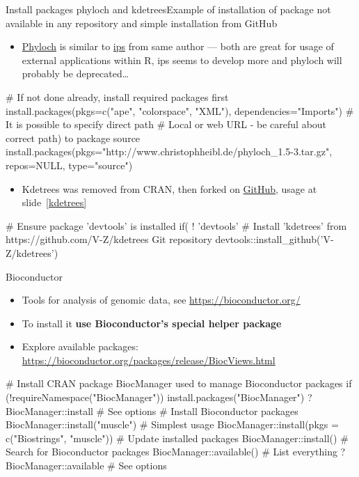 \documentclass[compress, xelatex, 11pt, xcolor=svgnames, aspectratio=169, url={hyphens, lowtilde}]{beamer}
\begin{document}
\begin{frame}[fragile]{Install packages phyloch and kdetrees}{Example of installation of package not available in any repository and simple installation from GitHub}
	\label{phyloch}
	\begin{itemize}
		\item \href{http://www.christophheibl.de/Rpackages.html}{Phyloch} is similar to \href{https://CRAN.R-project.org/package=ips}{ips} from same author --- both are great for usage of external applications within R, ips seems to develop more and phyloch will probably be deprecated\ldots
	\end{itemize}
	\begin{spluscode}
    # If not done already, install required packages first
    install.packages(pkgs=c("ape", "colorspace", "XML"),
      dependencies="Imports")
    # It is possible to specify direct path
    # Local or web URL - be careful about correct path) to package source
    install.packages(pkgs="http://www.christophheibl.de/phyloch_1.5-3.tar.gz",
      repos=NULL, type="source")
	\end{spluscode}
	\label{kdetreesinst}
	\begin{itemize}
		\item Kdetrees was removed from CRAN, then forked on \href{https://github.com/V-Z/kdetrees}{GitHub}, usage at slide~\ref{kdetrees}
	\end{itemize}
	\begin{spluscode}
    # Ensure package 'devtools' is installed
    if( ! 'devtools' %
    # Install 'kdetrees' from https://github.com/V-Z/kdetrees Git repository
    devtools::install_github('V-Z/kdetrees')
	\end{spluscode}
\end{frame}

\begin{frame}[fragile]{Bioconductor}
	\label{bioc}
	\begin{itemize}
		\item Tools for analysis of genomic data, see \url{https://bioconductor.org/}
		\item To install it \textbf{use Bioconductor's special helper package}
		\item Explore available packages: \url{https://bioconductor.org/packages/release/BiocViews.html}
	\end{itemize}
	\begin{spluscode}
    # Install CRAN package BiocManager used to manage Bioconductor packages
    if (!requireNamespace("BiocManager")) install.packages("BiocManager")
    ?BiocManager::install # See options
    # Install Bioconductor packages
    BiocManager::install("muscle") # Simplest usage
    BiocManager::install(pkgs = c("Biostrings", "muscle"))
    # Update installed packages
    BiocManager::install()
    # Search for Bioconductor packages
    BiocManager::available() # List everything
    ?BiocManager::available # See options
	\end{spluscode}
\end{frame}
\end{document}
